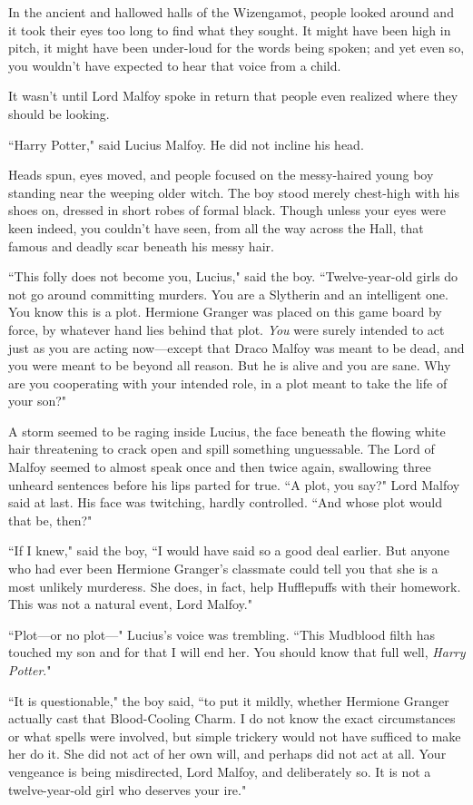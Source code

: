 In the ancient and hallowed halls of the Wizengamot, people looked around and it took their eyes too long to find what they sought. It might have been high in pitch, it might have been under-loud for the words being spoken; and yet even so, you wouldn't have expected to hear that voice from a child.

It wasn't until Lord Malfoy spoke in return that people even realized where they should be looking.

``Harry Potter," said Lucius Malfoy. He did not incline his head.

Heads spun, eyes moved, and people focused on the messy-haired young boy standing near the weeping older witch. The boy stood merely chest-high with his shoes on, dressed in short robes of formal black. Though unless your eyes were keen indeed, you couldn't have seen, from all the way across the Hall, that famous and deadly scar beneath his messy hair.

``This folly does not become you, Lucius," said the boy. ``Twelve-year-old girls do not go around committing murders. You are a Slytherin and an intelligent one. You know this is a plot. Hermione Granger was placed on this game board by force, by whatever hand lies behind that plot. \emph{You} were surely intended to act just as you are acting now—except that Draco Malfoy was meant to be dead, and you were meant to be beyond all reason. But he is alive and you are sane. Why are you cooperating with your intended role, in a plot meant to take the life of your son?"

A storm seemed to be raging inside Lucius, the face beneath the flowing white hair threatening to crack open and spill something unguessable. The Lord of Malfoy seemed to almost speak once and then twice again, swallowing three unheard sentences before his lips parted for true. ``A plot, you say?" Lord Malfoy said at last. His face was twitching, hardly controlled. ``And whose plot would that be, then?"

``If I knew," said the boy, ``I would have said so a good deal earlier. But anyone who had ever been Hermione Granger's classmate could tell you that she is a most unlikely murderess. She does, in fact, help Hufflepuffs with their homework. This was not a natural event, Lord Malfoy."

``Plot—or no plot—" Lucius's voice was trembling. ``This Mudblood filth has touched my son and for that I will end her. You should know that full well, \emph{Harry Potter}."

``It is questionable," the boy said, ``to put it mildly, whether Hermione Granger actually cast that Blood-Cooling Charm. I do not know the exact circumstances or what spells were involved, but simple trickery would not have sufficed to make her do it. She did not act of her own will, and perhaps did not act at all. Your vengeance is being misdirected, Lord Malfoy, and deliberately so. It is not a twelve-year-old girl who deserves your ire."

